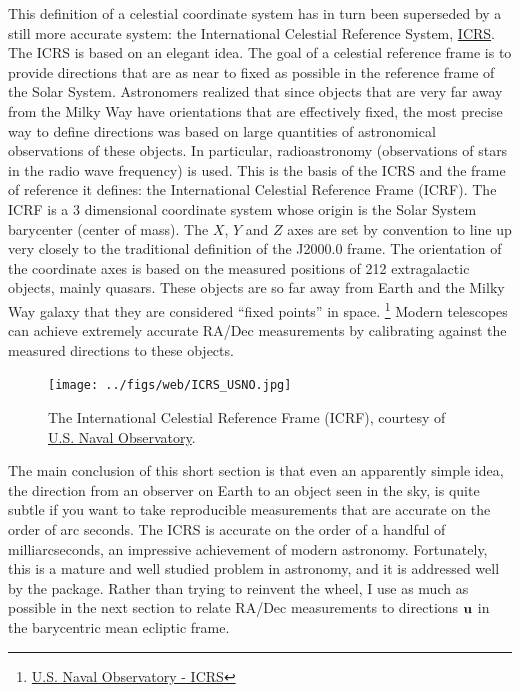 This definition of a celestial coordinate system has in turn been superseded by a still more accurate system:
the International Celestial Reference System, \href{https://en.wikipedia.org/wiki/International_Celestial_Reference_System}{ICRS}.
The ICRS is based on an elegant idea.
The goal of a celestial reference frame is to provide directions that are as near to fixed as possible in the reference frame of the Solar System.
Astronomers realized that since objects that are very far away from the Milky Way have orientations that are effectively fixed,
the most precise way to define directions was based on large quantities of astronomical observations of these objects.
In particular, radioastronomy (observations of stars in the radio wave frequency) is used.
This is the basis of the ICRS and the frame of reference it defines: the International Celestial Reference Frame (ICRF).
The ICRF is a 3 dimensional coordinate system whose origin is the Solar System barycenter (center of mass).
The $X$, $Y$ and $Z$ axes are set by convention to line up very closely to the traditional definition of the J2000.0 frame.
The orientation of the coordinate axes is based on the measured positions of 212 extragalactic objects, mainly quasars.
These objects are so far away from Earth and the Milky Way galaxy that they are considered ``fixed points'' in space.
\footnote{\href{http://kejian1.cmatc.cn/vod/comet/oceans/naval_observatory/navmenu.php_tab_1_page_3.2.1_type_text.htm}{U.S. Naval Observatory - ICRS}}
Modern telescopes can achieve extremely accurate RA/Dec measurements by calibrating against the measured directions to these objects.
\begin{figure}[hbt!]
\begin{center}
\texttt{[image: ../figs/web/ICRS\_USNO.jpg]}
\caption[The International Celestial Reference Frame (ICRF)]
{The International Celestial Reference Frame (ICRF), courtesy of 
\href{http://kejian1.cmatc.cn/vod/comet/oceans/naval_observatory/navmenu.php_tab_1_page_3.2.1_type_text.htm}{U.S. Naval Observatory}.}
\end{center}
\end{figure}

The main conclusion of this short section is that even an apparently simple idea, the direction from an observer on Earth to an object seen in the sky,
is quite subtle if you want to take reproducible measurements that are accurate on the order of arc seconds.
The ICRS is accurate on the order of a handful of milliarcseconds, an impressive achievement of modern astronomy.
Fortunately, this is a mature and well studied problem in astronomy, and it is addressed well by the  package.
Rather than trying to reinvent the wheel, I use  as much as possible in the next section
to relate RA/Dec measurements to directions $\mathbf{u}$ in the barycentric mean ecliptic frame.

